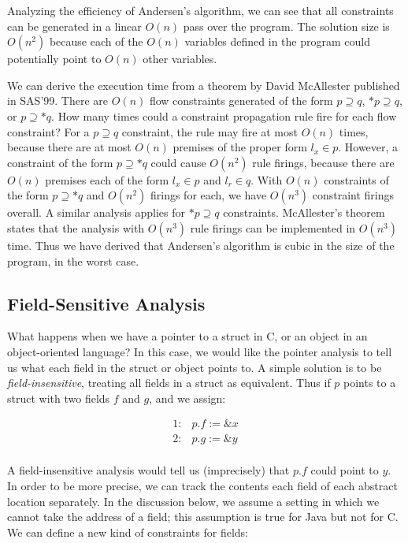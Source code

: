 \documentclass[11pt]{article}
\newcommand{\todo}[1]{}
\begin{document}
\begin{sloppypar}
Analyzing the efficiency of Andersen's algorithm, we can see that all constraints can be generated in a linear $O(n)$ pass over the program.  The solution size is $O(n^2)$ because each of the $O(n)$ variables defined in the program could potentially point to $O(n)$ other variables.

We can derive the execution time from a theorem by David McAllester published in SAS'99.  There are $O(n)$ flow constraints generated of the form $p \supseteq q$, $*p \supseteq q$, or $p \supseteq *q$.  How many times could a constraint propagation rule fire for each flow constraint?  For a $p \supseteq q$ constraint, the rule may fire at most $O(n)$ times, because there are at most $O(n)$ premises of the proper form $l_x \in p$.  However, a constraint of the form $p \supseteq *q$ could cause $O(n^2)$ rule firings, because there are $O(n)$ premises each of the form $l_x \in p$ and $l_r \in q$.  With $O(n)$ constraints of the form $p \supseteq *q$ and $O(n^2)$ firings for each, we have $O(n^3)$ constraint firings overall.  A similar analysis applies for $*p \supseteq q$ constraints.  McAllester's theorem states that the analysis with $O(n^3)$ rule firings can be implemented in $O(n^3)$ time.  Thus we have derived that Andersen's algorithm is cubic in the size of the program, in the worst case.

\todo{add citation to McAllester}

\subsection{Field-Sensitive Analysis}

What happens when we have a pointer to a struct in C, or an object in an object-oriented language? In this case, we would like the pointer analysis to tell us what each field in the struct or object points to.
%
A simple solution is to be \textit{field-insensitive}, treating all fields in a struct as equivalent. Thus if $p$ points to a struct with two fields $f$ and $g$, and we assign:

\[
\begin{array}{ll}
1: & p.f := \&x\\
2: & p.g := \&y\\
\end{array}
\]

A field-insensitive analysis would tell us (imprecisely) that $p.f$ could point to $y$.
%
In order to be more precise, we can track the contents each field of each abstract location separately.  In the discussion below, we assume a setting in which we cannot take the address of a field; this assumption is true for Java but not for C.  We can define a new kind of constraints for fields:


\end{sloppypar}
\end{document}
